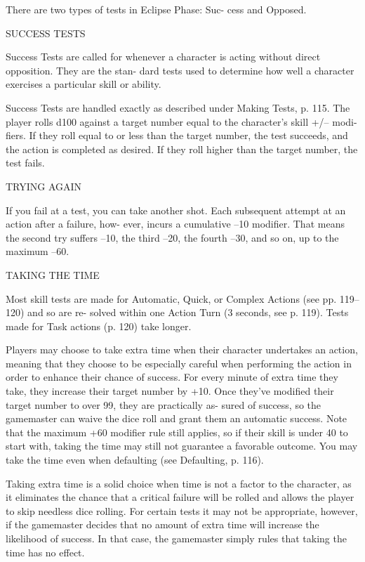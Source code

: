 There are two types of tests in Eclipse Phase: Suc-
cess and Opposed.

SUCCESS TESTS

Success Tests are called for whenever a character is
acting without direct opposition. They are the stan-
dard tests used to determine how well a character
exercises a particular skill or ability.

Success Tests are handled exactly as described under
Making Tests, p. 115. The player rolls d100 against a
target number equal to the character's skill +/– modi-
fiers. If they roll equal to or less than the target number,
the test succeeds, and the action is completed as desired.
If they roll higher than the target number, the test fails.

TRYING AGAIN

If you fail at a test, you can take another shot. Each
subsequent attempt at an action after a failure, how-
ever, incurs a cumulative –10 modifier. That means the
second try suffers –10, the third –20, the fourth –30,
and so on, up to the maximum –60.

TAKING THE TIME

Most skill tests are made for Automatic, Quick, or
Complex Actions (see pp. 119–120) and so are re-
solved within one Action Turn (3 seconds, see p. 119).
Tests made for Task actions (p. 120) take longer.

Players may choose to take extra time when their
character undertakes an action, meaning that they
choose to be especially careful when performing the
action in order to enhance their chance of success. For
every minute of extra time they take, they increase
their target number by +10. Once they've modified
their target number to over 99, they are practically as-
sured of success, so the gamemaster can waive the dice
roll and grant them an automatic success. Note that
the maximum +60 modifier rule still applies, so if their
skill is under 40 to start with, taking the time may still
not guarantee a favorable outcome. You may take the
time even when defaulting (see Defaulting, p. 116).

Taking extra time is a solid choice when time is not
a factor to the character, as it eliminates the chance
that a critical failure will be rolled and allows the
player to skip needless dice rolling. For certain tests it
may not be appropriate, however, if the gamemaster
decides that no amount of extra time will increase the
likelihood of success. In that case, the gamemaster
simply rules that taking the time has no effect.

